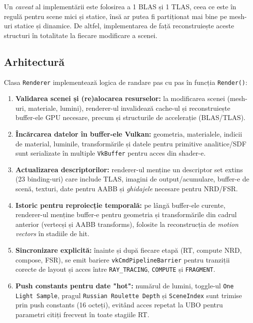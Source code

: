 \documentclass[12pt,a4paper]{report}
\numberwithin{equation}{section} %
\begin{document}
Un \textit{caveat} al implementării este folosirea a 1 BLAS și 1 TLAS, ceea ce este în regulă pentru scene mici și statice, însă ar putea fi partiționat mai bine pe mesh-uri statice și dinamice.
De altfel, implementarea de față reconstruiește aceste structuri în totalitate la fiecare modificare a scenei.

\subsection{Arhitectură}

Clasa \texttt{Renderer} implementează logica de randare pas cu pas în funcția \texttt{Render()}:

\begin{enumerate}
    \item \textbf{Validarea scenei și (re)alocarea resurselor:} la modificarea scenei (mesh-uri, materiale, lumini), renderer-ul invalidează cache-ul și reconstruiește buffer-ele GPU necesare, precum și structurile de accelerație (BLAS/TLAS).
    \item \textbf{Încărcarea datelor în buffer-ele Vulkan:} geometria, materialele, indicii de material, luminile, transformările și datele pentru primitive analitice/SDF sunt serializate în multiple \texttt{VkBuffer} pentru acces din shader-e.
    \item \textbf{Actualizarea descriptorilor:} renderer-ul menține un descriptor set extins (23 binding-uri) care include TLAS, imagini de output/acumulare, buffer-e de scenă, texturi, date pentru AABB și \textit{ghidajele} necesare pentru NRD/FSR.
    \item \textbf{Istoric pentru reproiecție temporală:} pe lângă buffer-ele curente, renderer-ul menține buffer-e pentru geometria și transformările din cadrul anterior (vertecși și AABB transforms), folosite la reconstrucția de \textit{motion vectors} în stadiile de hit.
    \item \textbf{Sincronizare explicită:} înainte și după fiecare etapă (RT, compute NRD, compose, FSR), se emit bariere \texttt{vkCmdPipelineBarrier} pentru tranziții corecte de layout și acces între \texttt{RAY\_TRACING}, \texttt{COMPUTE} și \texttt{FRAGMENT}.
    \item \textbf{Push constants pentru date "hot":} numărul de lumini, toggle-ul \texttt{One Light Sample}, pragul \texttt{Russian Roulette Depth} și \texttt{SceneIndex} sunt trimise prin push constants (16 octeți), evitând acces repetat la UBO pentru parametri citiți frecvent în toate stagiile RT.
\end{enumerate}
\end{document}

